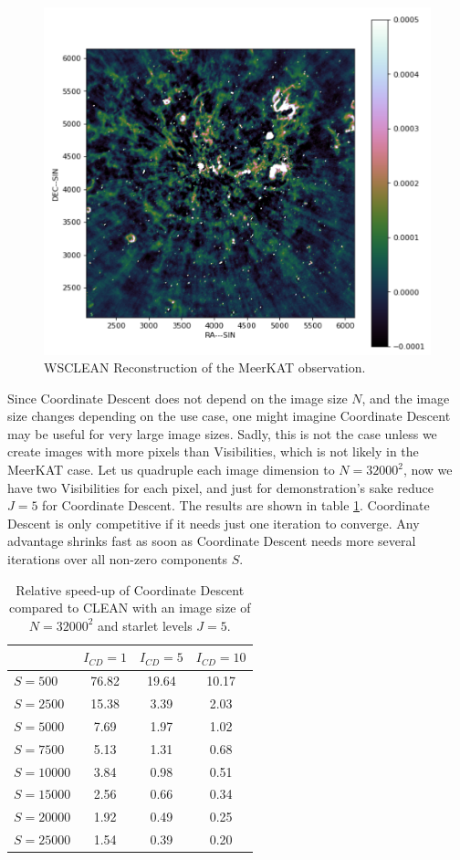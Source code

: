 \begin{figure}[h]
	\centering
	\includegraphics[width=0.6\linewidth]{./chapters/20.results/meerkat.png}
	\caption{WSCLEAN Reconstruction of the MeerKAT observation.}
	\label{results:wsclean}
\end{figure}

Since Coordinate Descent does not depend on the image size $N$, and the image size changes depending on the use case, one might imagine Coordinate Descent may be useful for very large image sizes. Sadly, this is not the case unless we create images with more pixels than Visibilities, which is not likely in the MeerKAT case. Let us quadruple each image dimension to $N=32000^2$, now we have two Visibilities for each pixel, and just for demonstration's sake reduce $J=5$ for Coordinate Descent. The results are shown in table \ref{res:cd:large:table}. Coordinate Descent is only competitive if it needs just one iteration to converge. Any advantage shrinks fast as soon as Coordinate Descent needs more several iterations over all non-zero components $S$. 

\begin{table}[h!]
	\begin{center}
		\begin{tabular}{l|c|c|c} %
			& $I_{CD} = 1$ & $I_{CD} = 5$ &  $I_{CD} = 10$\\
			\hline
			$S=500$ & 76.82 &  19.64 & 10.17 \\
			$S=2500$ & 15.38 &  3.39 & 2.03 \\
			$S=5000$ & 7.69 &  1.97 & 1.02 \\
			$S=7500$ & 5.13 &  1.31 & 0.68 \\
			$S=10000$ & 3.84 &  0.98 & 0.51 \\
			\hline
			$S=15000$ & 2.56 &  0.66 & 0.34 \\
			$S=20000$ & 1.92 &  0.49 & 0.25 \\
			$S=25000$ & 1.54 &  0.39 & 0.20 \\
		\end{tabular}
		\caption{Relative speed-up of Coordinate Descent compared to CLEAN with an image size of $N=32000^2$ and starlet levels $J=5$. }
		\label{res:cd:large:table}
	\end{center}
\end{table}


